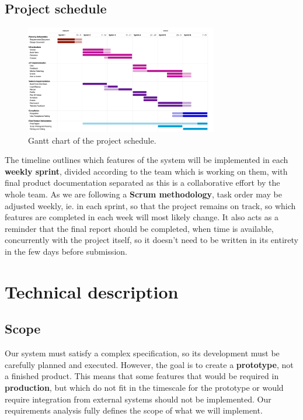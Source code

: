 \documentclass[10pt]{article}
\begin{document}
\subsection{Project schedule}
\begin{figure}[H]
    \centering
    \includegraphics[width=0.75\textwidth]{Timetable}
    \caption{Gantt chart of the project schedule.}
    \label{fig:project_schedule_gantt}
\end{figure}

The timeline outlines which features of the system will be implemented in each
\textbf{weekly sprint}, divided according to the team which is working on them,
with final product documentation separated as this is a collaborative effort by
the whole team. As we are following a \textbf{Scrum methodology}, task order may
be adjusted weekly, ie. in each sprint, so that the project remains on track, so
which features are completed in each week will most likely change. It also acts
as a reminder that the final report should be completed, when time is available,
concurrently with the project itself, so it doesn't need to be written in its
entirety in the few days before submission.


\section{Technical description}

\subsection{Scope}
Our system must satisfy a complex specification, so its development must be
carefully planned and executed. However, the goal is to create a
\textbf{prototype}, not a finished product. This means that some features that
would be required in \textbf{production}, but which do not fit in the timescale
for the prototype or would require integration from external systems should not
be implemented. Our requirements analysis fully defines the scope of what we
will implement.
\end{document}
